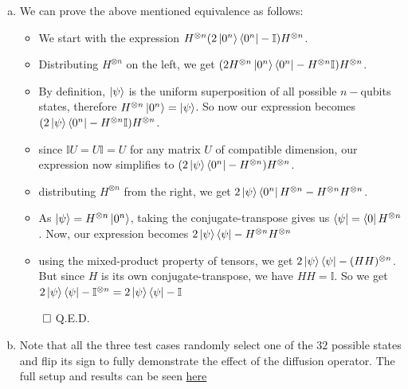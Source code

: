 \documentclass{article}
\begin{document}
\begin{enumerate}[(a)]
    \item We can prove the above mentioned equivalence as follows:
    \begin{itemize}
        \item We start with the expression $H^{\otimes n} (2 \ket{0^n} \bra{0^n} - \mathbb{I}) H^{\otimes n}$.
        \item Distributing $H^{\otimes n}$ on the left, we get $(2 H^{\otimes n} \ket{0^n}\bra{0^n} - H^{\otimes n}\mathbb{I}) H^{\otimes n}$.
        \item By definition, $\ket{\psi}$ is the uniform superposition of all possible $n-$qubits states, therefore $H^{\otimes n}\ket{0^n} = \ket{\psi}$. So now our expression becomes $(2 \ket{\psi}\bra{0^n} - H^{\otimes n}\mathbb{I})H^{\otimes n}$.
        \item since $\mathbb{I}U = U\mathbb{I} = U$ for any matrix $U$ of compatible dimension, our expression now simplifies to $(2 \ket{\psi}\bra{0^n} - H^{\otimes n}) H^{\otimes n}$.
        \item distributing $H^{\otimes n}$ from the right, we get $2\ket{\psi}\bra{0^n}H^{\otimes n} - H^{\otimes n}H^{\otimes n}$.
        \item As $\ket{\psi} = H^{\otimes n}\ket{0^n}$, taking the conjugate-transpose gives us $\bra{\psi} = \bra{0} H^{\otimes n}$. Now, our expression becomes $2\ket{\psi}\bra{\psi} - H^{\otimes n}H^{\otimes n}$
        \item using the mixed-product property of tensors, we get $2\ket{\psi}\bra{\psi} - (HH)^{\otimes n}$. But since $H$ is its own conjugate-transpose, we have $HH = \mathbb{I}$. So we get $2\ket{\psi}\bra{\psi} - \mathbb{I}^{\otimes n} = 2\ket{\psi}\bra{\psi} - \mathbb{I}$ 
    \end{itemize}
    $\qed$ Q.E.D.

    \item
    Note that all the three test cases randomly select one of the $32$ possible states and flip its sign to fully demonstrate the effect of the diffusion operator. The full setup and results can be seen \href{https://colab.research.google.com/drive/11P-5j1ke_xIk-jOb2NPHdzISqHc27nK3?usp=sharing}{here}
\end{enumerate}
\end{document}

